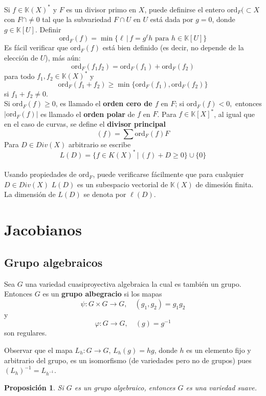 \documentclass[12pt,a4paper]{report}
\newcommand{\K}{\mathbb{K}}
\newcommand{\ord}{\mbox{ord}}
\newtheorem{prop}{Proposición}[chapter]
\begin{document}
Si $f \in \K (X)^{*}$ y $F$ es un divisor  primo en $X$, puede definirse el entero $\ord_{F} ( \subset X$ con $ F \cap \neq 0 $ tal que la subvariedad $F \cap  U$ en $U$ está dada por $g=0$, donde $g \in \K [U]$. Definir $$\ord _{F} (f) = \min \{ \ell  \, | \, f = g^{\ell} h  \mbox{ para } h \in \K[U] \}$$ Es fácil verificar que $\ord_{F}(f)$ está bien definido (es decir, no depende de la elección de $U$), más aún: $$ \ord_{F} (f_{1}f_{2}) = \ord_{F} (f_{1}) + \ord _{F} (f_{2}) $$ para todo $f_{1}, f_{2} \in \K (X)^{*}$ y $$ \ord_{F}(f_{1}+f_{2}) \geq \min \{ \ord_{F} (f_{1}) ,\ord_{F}(f_{2}) \} $$ si $f_{1}+f_{2}\neq 0$.\\

Si $\ord_{F}(f) \geq 0$, es llamado el \textbf{orden cero de $f$} en $F$; si $\ord_{F}(f) < 0,$ entonces $|\ord_{F}(f)|$ es llamado el \textbf{orden polar} de $f$ en $F$. Para $f \in \K [X]^{*}$, al igual que en el caso de curvas, se define el \textbf{divisor  principal} $$(f) = \sum \ord_{F}(f)F$$ Para $D \in Div (X)$ arbitrario se escribe $$L (D) = \{ f \in K (X)^{*}  \,| \, (f) + D  \geqslant 0 \} \cup \{0\} $$ \\

Usando propiedades de $\ord_{F}$, puede verificarse fácilmente que para cualquier $D \in Div (X)$ $L(D)$ es un subespacio vectorial de $\K(X)$ de dimesión finita. La dimensión de $L(D)$ se denota por $\ell (D)$.


\section{Jacobianos}

\subsection{Grupo algebraicos}

Sea $G$ una variedad cuasiproyectiva algebraica la cual es también un grupo. Entonces $G$ es un \textbf{grupo albegracio} si los mapas
$$ \psi : G \times G  \rightarrow G , \quad (g_{1}, g_{2})= g_{1} g_{2}$$ y $$ \varphi : G \rightarrow G ,  \quad(g) = g^{-1} $$ son regulares.

Observar que el mapa $ L_{h}:G \rightarrow G$, $L_{h}(g) =hg$, donde $h$ es un elemento fijo y arbitrario del grupo, es un isomorfismo (de variedades pero no de grupos) pues $(L_{h})^{-1} = L_{h^{-1}}$.

\begin{prop}
	Si $G$ es un grupo algebraico, entonces $G$ es una variedad suave.
\end{prop}
\end{document}
